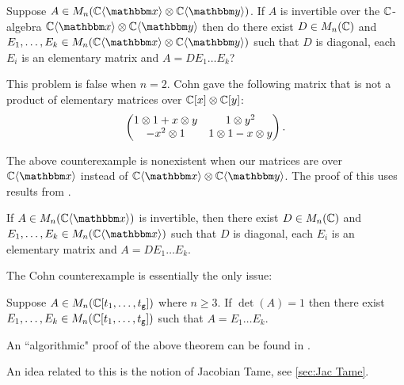 
\begin{problem}
	Suppose $A\in M_n(\C\fralg{\bbx}\otimes \C\fralg{\bby})$. If $A$ is invertible over the $\mathbb{C}$-algebra $\C\fralg{\bbx}\otimes \C\fralg{\bby}$ then do there exist $D\in M_n(\mathbb{C})$ and $E_1,\dots, E_k\in M_n(\C\fralg{\bbx}\otimes \C\fralg{\bby})$ such that $D$ is diagonal, each $E_i$ is an elementary matrix and $A = DE_1\dots E_k$?
\end{problem}

\begin{remark}
	This problem is false when $n=2$. Cohn gave the following matrix that is not a product of elementary matrices over $\mathbb{C}[x]\otimes \mathbb{C}[y]$:
	\[
		\begin{pmatrix} 1\otimes 1 + x\otimes y & 1\otimes y^2 \\ -x^2\otimes 1 & 1\otimes 1 - x\otimes y \end{pmatrix}.
	\]
\end{remark}

The above counterexample is nonexistent when our matrices are over $\C\fralg{\bbx}$ instead of $\C\fralg{\bbx}\otimes \C\fralg{\bby}$. The proof of this uses results from \cite{Cohn06}.

\begin{theorem}
	If $A\in M_n(\C\fralg{\bbx})$ is invertible, then there exist $D\in M_n(\mathbb{C})$ and $E_1,\dots, E_k\in M_n(\C\fralg{\bbx})$ such that $D$ is diagonal, each $E_i$ is an elementary matrix and $A = DE_1\dots E_k$.
\end{theorem}

The Cohn counterexample is essentially the only issue:

\begin{theorem}
	Suppose $A\in M_n(\mathbb{C}[t_1,\dots, t_{\texttt{g}}])$ where $n\geq 3$. If $\det(A) = 1$ then there exist $E_1,\dots, E_k\in M_n(\mathbb{C}[t_1,\dots, t_{\texttt{g}}])$ such that $A = E_1\dots E_k$.
\end{theorem}

An ``algorithmic" proof of the above theorem can be found in \cite{PW95}.


\begin{remark}
	An idea related to this is the notion of Jacobian Tame, see \ref{sec:Jac Tame}.
\end{remark}


